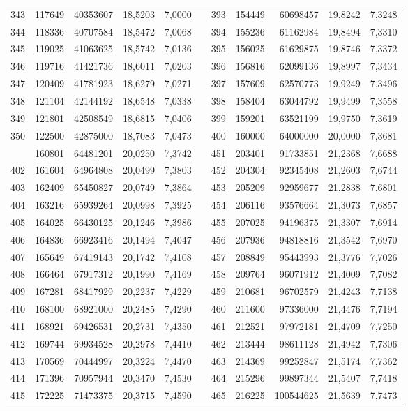 \begin{longtable}{rrrrrrrrrrr}
343&117649&40353607&18,5203&7,0000&&393&154449&60698457&19,8242&7,3248\\
344&118336&40707584&18,5472&7,0068&&394&155236&61162984&19,8494&7,3310\\
345&119025&41063625&18,5742&7,0136&&395&156025&61629875&19,8746&7,3372\\
346&119716&41421736&18,6011&7,0203&&396&156816&62099136&19,8997&7,3434\\
347&120409&41781923&18,6279&7,0271&&397&157609&62570773&19,9249&7,3496\\
348&121104&42144192&18,6548&7,0338&&398&158404&63044792&19,9499&7,3558\\
349&121801&42508549&18,6815&7,0406&&399&159201&63521199&19,9750&7,3619\\
350&122500&42875000&18,7083&7,0473&&400&160000&64000000&20,0000&7,3681\\
\newpage
401&160801&64481201&20,0250&7,3742&&451&203401&91733851&21,2368&7,6688\\
402&161604&64964808&20,0499&7,3803&&452&204304&92345408&21,2603&7,6744\\
403&162409&65450827&20,0749&7,3864&&453&205209&92959677&21,2838&7,6801\\
404&163216&65939264&20,0998&7,3925&&454&206116&93576664&21,3073&7,6857\\
405&164025&66430125&20,1246&7,3986&&455&207025&94196375&21,3307&7,6914\\
406&164836&66923416&20,1494&7,4047&&456&207936&94818816&21,3542&7,6970\\
407&165649&67419143&20,1742&7,4108&&457&208849&95443993&21,3776&7,7026\\
408&166464&67917312&20,1990&7,4169&&458&209764&96071912&21,4009&7,7082\\
409&167281&68417929&20,2237&7,4229&&459&210681&96702579&21,4243&7,7138\\
410&168100&68921000&20,2485&7,4290&&460&211600&97336000&21,4476&7,7194\\
411&168921&69426531&20,2731&7,4350&&461&212521&97972181&21,4709&7,7250\\
412&169744&69934528&20,2978&7,4410&&462&213444&98611128&21,4942&7,7306\\
413&170569&70444997&20,3224&7,4470&&463&214369&99252847&21,5174&7,7362\\
414&171396&70957944&20,3470&7,4530&&464&215296&99897344&21,5407&7,7418\\
415&172225&71473375&20,3715&7,4590&&465&216225&100544625&21,5639&7,7473\\

\end{longtable}
